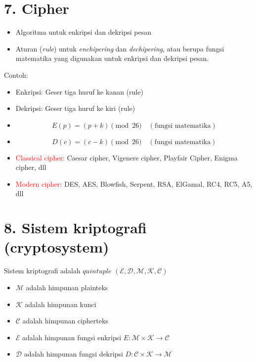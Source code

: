 \documentclass{article}
\begin{document}
\newpage


\section*{7. Cipher}

\begin{itemize}
    \item Algoritma untuk enkripsi dan dekripsi pesan
    \item Aturan (\textit{rule}) untuk \textit{enchipering} dan \textit{dechipering}, atau berupa fungsi matematika yang digunakan untuk enkripsi dan dekripsi pesan.
\end{itemize}

Contoh:
\begin{itemize}
    \item Enkripsi: Geser tiga huruf ke kanan \quad (rule)
    \item Dekripsi: Geser tiga huruf ke kiri \quad (rule)
    \item \[ E(p) = (p + k) \pmod{26} \quad(\text{fungsi matematika}) \]
    \item \[ D(c) = (c - k) \pmod{26} \quad(\text{fungsi matematika}) \]
\end{itemize}

\begin{itemize}
    \item \textcolor{red}{Classical cipher}: Caesar cipher, Vigenere cipher, Playfair Cipher, Enigma cipher, dll
    \item \textcolor{red}{Modern cipher}: DES, AES, Blowfish, Serpent, RSA, ElGamal, RC4, RC5, A5, dll
\end{itemize}

\newpage


\section*{8. Sistem kriptografi (cryptosystem)}

Sistem kriptografi adalah $quintuple$ $(\mathcal{E}, \mathcal{D}, \mathcal{M}, \mathcal{K}, \mathcal{C})$
\begin{itemize}
    \item $\mathcal{M}$ adalah himpunan plainteks
    \item $\mathcal{K}$ adalah himpunan kunci
    \item $\mathcal{C}$ adalah himpunan cipherteks
    \item $\mathcal{E}$ adalah himpunan fungsi enkripsi $E: \mathcal{M} \times \mathcal{K} \to \mathcal{C}$
    \item $\mathcal{D}$ adalah himpunan fungsi dekripsi $D: \mathcal{C} \times \mathcal{K} \to \mathcal{M}$
\end{itemize}
\end{document}
